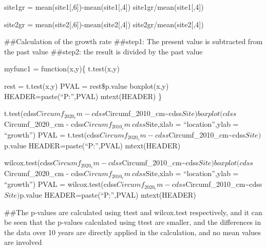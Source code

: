 \documentclass[
]{article}
\begin{document}
site1gr = mean(site1{[},6{]})-mean(site1{[},4{]})
site1gr/mean(site1{[},4{]})

site2gr = mean(site2{[},6{]})-mean(site2{[},4{]})
site2gr/mean(site2{[},4{]})

\#\#Calculation of the growth rate \#\#step1: The present value is
subtracted from the past value \#\#step2: the result is divided by the
past value

myfunc1 = function(x,y)\{ t.test(x,y)

rest = t.test(x,y) PVAL = rest\$p.value boxplot(x,y)
HEADER=paste(``P:'',PVAL) mtext(HEADER) \}

t.test(cdss\(Circumf_2020_cm - cdss\)Circumf\_2010\_cm\textasciitilde cdss\(Site) boxplot(cdss\)Circumf\_2020\_cm
- cdss\(Circumf_2010_cm~cdss\)Site,xlab = ``location'',ylab =
``growth'') PVAL =
t.test(cdss\(Circumf_2020_cm - cdss\)Circumf\_2010\_cm\textasciitilde cdss\(Site)\)p.value
HEADER=paste(``P:'',PVAL) mtext(HEADER)

wilcox.test(cdss\(Circumf_2020_cm - cdss\)Circumf\_2010\_cm\textasciitilde cdss\(Site) boxplot(cdss\)Circumf\_2020\_cm
- cdss\(Circumf_2010_cm~cdss\)Site,xlab = ``location'',ylab =
``growth'') PVAL =
wilcox.test(cdss\(Circumf_2020_cm - cdss\)Circumf\_2010\_cm\textasciitilde cdss\(Site)\)p.value
HEADER=paste(``P:'',PVAL) mtext(HEADER)

\#\#The p-values are calculated using ttest and wilcox.test
respectively, and it can be seen that the p-values calculated using
ttest are smaller, and the differences in the data over 10 years are
directly applied in the calculation, and no mean values are involved
\end{document}
